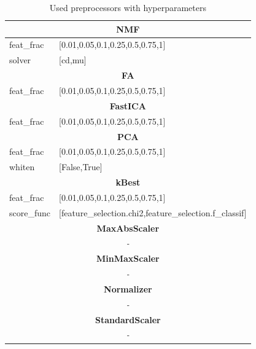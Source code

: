 {\footnotesize
\begin{longtable}{l l}

\caption{Used preprocessors with hyperparameters}\\

\midrule
\multicolumn{2}{c}{\textbf{NMF }} \\
\midrule

feat\_frac & [0.01,0.05,0.1,0.25,0.5,0.75,1] \\
solver & [cd,mu] \\
 
\midrule
\multicolumn{2}{c}{\textbf{FA }} \\
\midrule

feat\_frac & [0.01,0.05,0.1,0.25,0.5,0.75,1] \\
 
\midrule
\multicolumn{2}{c}{\textbf{FastICA }} \\
\midrule

feat\_frac & [0.01,0.05,0.1,0.25,0.5,0.75,1] \\

\midrule
\multicolumn{2}{c}{\textbf{PCA }} \\
\midrule

feat\_frac & [0.01,0.05,0.1,0.25,0.5,0.75,1] \\
whiten & [False,True] \\

\midrule
\multicolumn{2}{c}{\textbf{kBest }} \\
\midrule

feat\_frac & [0.01,0.05,0.1,0.25,0.5,0.75,1] \\
score\_func & [feature\_selection.chi2,feature\_selection.f\_classif] \\
 
\midrule
\multicolumn{2}{c}{\textbf{MaxAbsScaler  }} \\
\midrule
\multicolumn{2}{c}{\textit{-}} \\

\midrule
\multicolumn{2}{c}{\textbf{MinMaxScaler  }} \\
\midrule
\multicolumn{2}{c}{\textit{-}} \\

\midrule
\multicolumn{2}{c}{\textbf{Normalizer  }} \\
\midrule
\multicolumn{2}{c}{\textit{-}} \\

\midrule
\multicolumn{2}{c}{\textbf{StandardScaler  }} \\
\midrule
\multicolumn{2}{c}{\textit{-}} \\

\bottomrule

\end{longtable}
}

